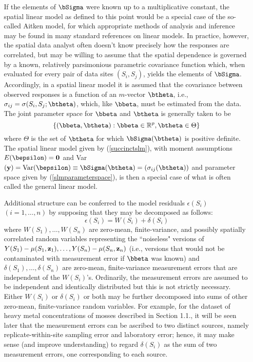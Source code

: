 If the elements of $\bSigma$ were known up to a multiplicative constant, the spatial linear model as defined to this point would be a special case of the so-called Aitken model, for which appropriate methods of analysis and inference may be found in many standard references on linear models.  In practice, however, the spatial data analyst often doesn't know precisely how the responses are correlated, but may be willing to assume that the spatial dependence is governed by a known, relatively parsimonious parametric covariance function which, when evaluated for every pair of data sites $(S_i,S_j)$, yields the elements of $\bSigma$.  Accordingly, in a spatial linear model it is assumed that the covariance between observed responses is a function of an $m$-vector $\btheta$, i.e., $\sigma_{ij}=\sigma(S_i,S_j;\btheta)$, which, like $\bbeta$, must be estimated from the data.  The joint parameter space for $\bbeta$ and $\btheta$ is generally taken to be
\begin{equation}\label{slmparameterspace}
\{(\bbeta,\btheta):\bbeta\in\mathbb{R}^p, \btheta\in\Theta\}
\end{equation}
where $\Theta$ is the set of $\btheta$ for which $\bSigma(\btheta)$ is positive definite.  The spatial linear model given by (\ref{succinctslm}), with moment assumptions $E(\bepsilon)={\bf 0}$ and Var$({\bf y})=\mbox{Var}(\bepsilon)\equiv\bSigma(\btheta)=(\sigma_{ij}(\btheta))$ and parameter space given by (\ref{slmparameterspace}), is then a special case of what is often called the general linear model.

Additional structure can be conferred to the model residuals $\epsilon(S_i)$ $(i=1,\ldots,n)$ by supposing that they may be decomposed as follows:
\begin{equation}\label{errordecomp}
\epsilon(S_i)=W(S_i)+\delta(S_i)
\end{equation}
where $W(S_1),\ldots,W(S_n)$ are zero-mean, finite-variance, and possibly spatially correlated random variables representing the ``noiseless" versions of $Y(S_1)-\mu(S_1,{\bf z}_1),\ldots,Y(S_n)-\mu(S_n,{\bf z}_n)$ (i.e., versions that would not be contaminated with measurement error if $\bbeta$ was known) and $\delta(S_1),\ldots,\delta(S_n)$ are zero-mean, finite-variance measurement errors that are independent of the $W(S_i)$'s.  Ordinarily, the measurement errors are assumed to be independent and identically distributed but this is not strictly necessary.  Either $W(S_i)$ or $\delta(S_i)$ or both may be further decomposed into sums of other zero-mean, finite-variance random variables.  For example, for the dataset of heavy metal concentrations of mosses described in Section 1.1., it will be seen later that the measurement errors can be ascribed to two distinct sources, namely replicate-within-site sampling error and laboratory error; hence, it may make sense (and improve understanding) to regard $\delta(S_i)$ as the sum of two measurement errors, one corresponding to each source.

